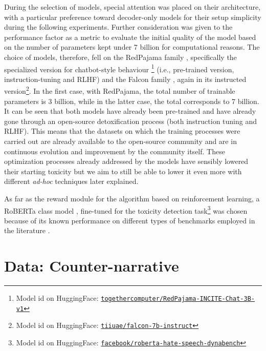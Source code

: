 During the selection of models, special attention was placed on their architecture, with a particular preference toward decoder-only models for their setup simplicity during the following experiments. Further consideration was given to the performance factor as a metric to evaluate the initial quality of the model based on the number of parameters kept under 7 billion for computational reasons. The choice of models, therefore, fell on the RedPajama family \citep{together2023redpajama}, specifically the specialized version for chatbot-style behaviour \footnote{Model id on HuggingFace: \href{https://huggingface.co/togethercomputer/RedPajama-INCITE-Chat-3B-v1}{ \texttt{togethercomputer/RedPajama-INCITE-Chat-3B-v1}}} (i.e., pre-trained version, instruction-tuning and RLHF) and the Falcon family \citep{falcon}, again in its instructed version\footnote{Model id on HuggingFace: \href{https://huggingface.co/tiiuae/falcon-7b-instruct}{ \texttt{tiiuae/falcon-7b-instruct}}}. In the first case, with RedPajama, the total number of trainable parameters is 3 billion, while in the latter case, the total corresponds to 7 billion. It can be seen that both models have already been pre-trained and have already gone through an open-source detoxification process (both instruction tuning and RLHF). This means that the datasets on which the training processes were carried out are already available to the open-source community and are in continuous evolution and improvement by the community itself. These optimization processes already addressed by the models have sensibly lowered their starting toxicity but we aim to still be able to lower it even more with different \textit{ad-hoc} techniques later explained.


As far as the reward module for the algorithm based on reinforcement learning, a RoBERTa class model \citep{vidgen-etal-2021-learning}, fine-tuned for the toxicity detection task\footnote{Model id on HuggingFace: \href{https://huggingface.co/facebook/roberta-hate-speech-dynabench-r4-target}{\texttt{facebook/roberta-hate-speech-dynabench}}} was chosen because of its known performance on different types of benchmarks employed in the literature \citep{vidgen-etal-2021-learning}.


\section {Data: Counter-narrative}
\label{chapter:counter-narrative}

